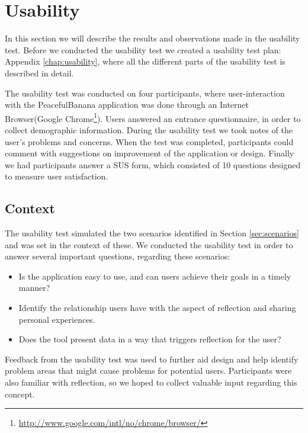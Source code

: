 \section{Usability}
In this section we will describe the results and observations made in the usability test. Before we conducted the usability test we created a usability test plan: Appendix \ref{chap:usability}, where all the different parts of the usability test is described in detail.

The usability test was conducted on four participants, where user-interaction with the PeacefulBanana application was done through an Internet Browser(Google Chrome\footnote{\url{http://www.google.com/intl/no/chrome/browser/}}). Users answered an entrance questionnaire, in order to collect demographic information. During the usability test we took notes of the user's problems and concerns. When the test was completed, participants could comment with suggestions on improvement of the application or design. Finally we had participants answer a SUS form, which consisted of 10 questions designed to measure user satisfaction. 

\subsection{Context}
\label{subsec:context}
The usability test simulated the two scenarios identified in Section \ref{sec:scenarios} and was set in the context of these. We conducted the usability test in order to answer several important questions, regarding these scenarios: 
\begin{itemize}
	\item Is the application easy to use, and can users achieve their goals in a timely manner?
	\item Identify the relationship users have with the aspect of reflection and sharing personal experiences.
	\item Does the tool present data in a way that triggers reflection for the user?
\end{itemize}
Feedback from the usability test was used to further aid design and help identify problem areas that might cause problems for potential users. Participants were also familiar with reflection, so we hoped to collect valuable input regarding this concept.

